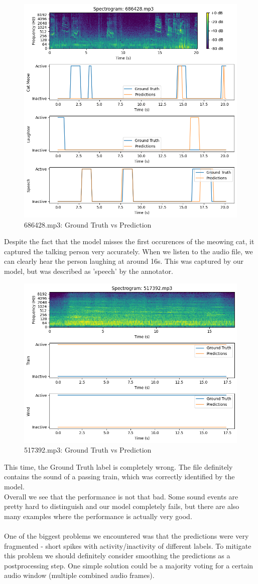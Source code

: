 \documentclass{article}
\begin{document}
\begin{figure}[H]
  \centering
  \includegraphics[width=0.6\linewidth]{686428_pred.png}
  \caption{686428.mp3: Ground Truth vs Prediction}
  \label{fig8}
\end{figure}

Despite the fact that the model misses the first occurences of the meowing cat, it captured the talking person very accurately. When we listen to the audio file, we can clearly hear the person laughing at around 16s. This was captured by our model, but was described as 'speech' by the annotator. 

\begin{figure}[H]
  \centering
  \includegraphics[width=0.6\linewidth]{517392_pred.png}
  \caption{517392.mp3: Ground Truth vs Prediction}
  \label{fig9}
\end{figure}

This time, the Ground Truth label is completely wrong. The file definitely contains the sound of a passing train, which was correctly identified by the model. \\

Overall we see that the performance is not that bad. Some sound events are pretty hard to distinguish and our model completely fails, but there are also many examples where the performance is actually very good.
\\\\
One of the biggest problems we encountered was that the predictions were very fragmented - short spikes with activity/inactivity of different labels. To mitigate this problem we should definitely consider smoothing the predictions as a postprocessing step. One simple solution could be a majority voting for a certain audio window (multiple combined audio frames).
\end{document}
